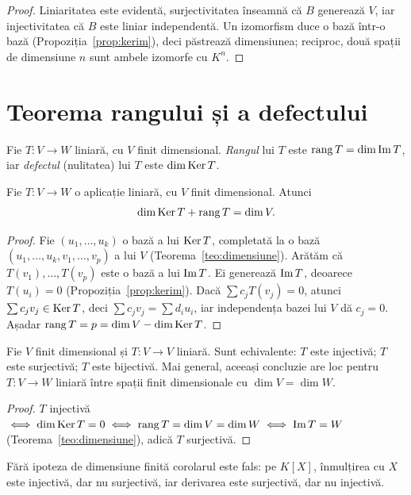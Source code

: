 \begin{proof}
Liniaritatea este evidentă, surjectivitatea înseamnă că $B$ generează $V$, iar injectivitatea că $B$ este liniar independentă. Un izomorfism duce o bază într-o bază (Propoziția~\ref{prop:kerim}), deci păstrează dimensiunea; reciproc, două spații de dimensiune $n$ sunt ambele izomorfe cu $K^n$.
\end{proof}

\section{Teorema rangului și a defectului}

\begin{definitie}
Fie $T:V\to W$ liniară, cu $V$ finit dimensional. \emph{Rangul} lui $T$ este $\operatorname{rang} T=\dim\operatorname{Im} T$, iar \emph{defectul} (nulitatea) lui $T$ este $\dim\operatorname{Ker} T$.
\end{definitie}

\begin{teorema}\label{teo:rangnulitate}
Fie $T:V\to W$ o aplicație liniară, cu $V$ finit dimensional. Atunci
\[
\dim\operatorname{Ker} T+\operatorname{rang} T=\dim V .
\]
\end{teorema}

\begin{proof}
Fie $(u_1,\dots,u_k)$ o bază a lui $\operatorname{Ker} T$, completată la o bază $(u_1,\dots,u_k,v_1,\dots,v_p)$ a lui $V$ (Teorema~\ref{teo:dimensiune}). Arătăm că $T(v_1),\dots,T(v_p)$ este o bază a lui $\operatorname{Im} T$. Ei generează $\operatorname{Im} T$, deoarece $T(u_i)=0$ (Propoziția~\ref{prop:kerim}). Dacă $\sum c_jT(v_j)=0$, atunci $\sum c_jv_j\in\operatorname{Ker} T$, deci $\sum c_jv_j=\sum d_iu_i$, iar independența bazei lui $V$ dă $c_j=0$. Așadar $\operatorname{rang} T=p=\dim V-\dim\operatorname{Ker} T$.
\end{proof}

\begin{corolar}\label{cor:injsurj}
Fie $V$ finit dimensional și $T:V\to V$ liniară. Sunt echivalente: $T$ este injectivă; $T$ este surjectivă; $T$ este bijectivă. Mai general, aceeași concluzie are loc pentru $T:V\to W$ liniară între spații finit dimensionale cu $\dim V=\dim W$.
\end{corolar}

\begin{proof}
$T$ injectivă $\iff\dim\operatorname{Ker} T=0\iff\operatorname{rang} T=\dim V=\dim W\iff\operatorname{Im} T=W$ (Teorema~\ref{teo:dimensiune}), adică $T$ surjectivă.
\end{proof}

\begin{observatie}
Fără ipoteza de dimensiune finită corolarul este fals: pe $K[X]$, înmulțirea cu $X$ este injectivă, dar nu surjectivă, iar derivarea este surjectivă, dar nu injectivă.
\end{observatie}

